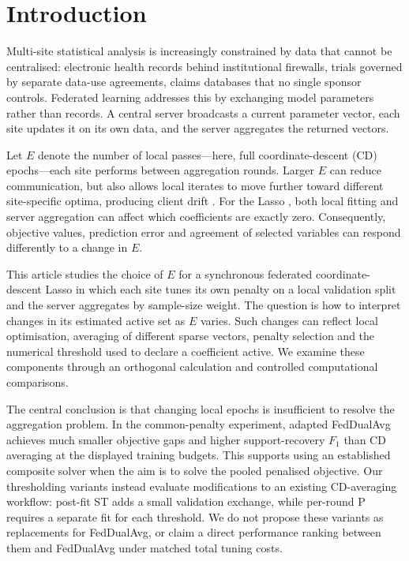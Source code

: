 \section{Introduction}
\label{sec:intro}

Multi-site statistical analysis is increasingly constrained by data that
cannot be centralised: electronic health records behind institutional
firewalls, trials governed by separate data-use agreements, claims
databases that no single sponsor controls. Federated learning
\citep{mcmahan2017,kairouz2021} addresses this by exchanging model
parameters rather than records. A central server broadcasts a current
parameter vector, each site updates it on its own data, and the server
aggregates the returned vectors.

Let $E$ denote the number of local passes---here, full coordinate-descent
(CD) epochs---each site performs between aggregation rounds. Larger $E$
can reduce communication, but also allows local iterates to move further
toward different site-specific optima, producing client drift
\citep{li2020convergence,karimireddy2020}. For the Lasso
\citep{tibshirani1996}, both local fitting and server aggregation can affect
which coefficients are exactly zero. Consequently, objective values,
prediction error and agreement of selected variables can respond
differently to a change in $E$.

This article studies the choice of $E$ for a synchronous federated
coordinate-descent Lasso in which each site tunes its own penalty on a
local validation split and the server aggregates by sample-size weight.
The question is how to interpret changes in its estimated active set as
$E$ varies. Such changes can reflect local optimisation, averaging of
different sparse vectors, penalty selection and the numerical threshold
used to declare a coefficient active. We examine these components through
an orthogonal calculation and controlled computational comparisons.

The central conclusion is that changing local epochs is insufficient to
resolve the aggregation problem. In the common-penalty experiment,
adapted FedDualAvg achieves much smaller objective gaps and higher
support-recovery $F_1$ than CD averaging at the displayed training budgets.
This supports using an established composite solver when the aim is to
solve the pooled penalised objective. Our thresholding variants instead
evaluate modifications to an existing CD-averaging workflow: post-fit ST
adds a small validation exchange, while per-round P requires a separate
fit for each threshold. We do not propose these variants as replacements
for FedDualAvg, or claim a direct performance ranking between them and
FedDualAvg under matched total tuning costs.

